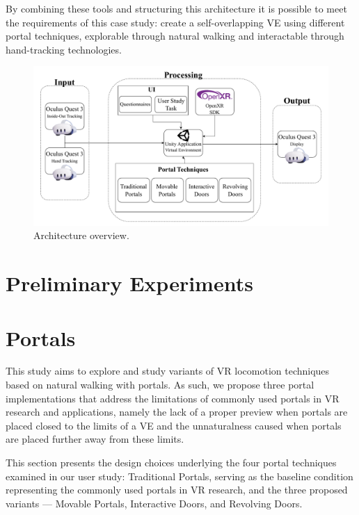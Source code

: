 By combining these tools and structuring this architecture it is possible to meet the requirements of this case study: create a self-overlapping 
\gls{VE} using different portal techniques, explorable through natural walking and interactable through hand-tracking technologies.

\begin{figure}[t]
    \centering
     \includegraphics[width=\textwidth]{NOVAthesisFiles/Images/schemes/architecture-overview.drawio.pdf}
     \caption[Overview of the architecture of the solution.]
     {Architecture overview.}
     \label{fig:architecture}
\end{figure}


\section{Preliminary Experiments}
\label{sec:preliminary}


\section{Portals}
\label{sec:portal-design}

This study aims to explore and study variants of \gls{VR} locomotion techniques based on natural walking with portals. As such, we propose three 
portal implementations that address the limitations of commonly used portals in \gls{VR} research and applications, namely the lack of a proper 
preview when portals are placed closed to the limits of a \gls{VE} and the unnaturalness caused when portals are placed further away from these 
limits.

This section presents the design choices underlying the four portal techniques examined in our user study: Traditional Portals, serving as the baseline 
condition representing the commonly used portals in \gls{VR} research, and the three proposed variants — Movable Portals, 
Interactive Doors, and Revolving Doors.

